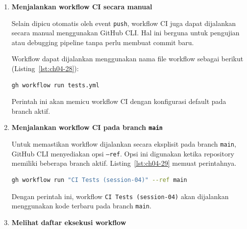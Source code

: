 \begin{enumerate}
Agar perubahan dapat diproses oleh GitHub Actions, commit lokal perlu
dikirim ke repository GitHub, khususnya ke branch \texttt{main} yang
digunakan sebagai branch utama pada modul ini. Perintah lengkapnya ada pada Listing~\ref{lst:ch04-27}.

\begin{lstlisting}[language=bash, caption={Mengirim perubahan ke repositori (3)}, label={lst:ch04-27}]
git push origin main
\end{lstlisting}

Setelah perintah ini dijalankan, GitHub akan menerima perubahan dan
event \texttt{push} akan menjadi salah satu pemicu workflow CI.

\item \textbf{Menjalankan workflow CI secara manual}

Selain dipicu otomatis oleh event \texttt{push}, workflow CI juga dapat
dijalankan secara manual menggunakan GitHub CLI. Hal ini berguna untuk
pengujian atau debugging pipeline tanpa perlu membuat commit baru.

Workflow dapat dijalankan menggunakan nama file workflow sebagai berikut (Listing~\ref{lst:ch04-28}):

\begin{lstlisting}[language=bash, caption={Memantau workflow di GitHub (2)}, label={lst:ch04-28}]
gh workflow run tests.yml
\end{lstlisting}

Perintah ini akan memicu workflow CI dengan konfigurasi default pada
branch aktif.

\item \textbf{Menjalankan workflow CI pada branch \texttt{main}}

Untuk memastikan workflow dijalankan secara eksplisit pada branch
\texttt{main}, GitHub CLI menyediakan opsi \texttt{--ref}. Opsi ini
digunakan ketika repository memiliki beberapa branch aktif. Listing~\ref{lst:ch04-29} memuat perintahnya.

\begin{lstlisting}[language=bash, caption={Memantau workflow di GitHub (3)}, label={lst:ch04-29}]
gh workflow run "CI Tests (session-04)" --ref main
\end{lstlisting}

Dengan perintah ini, workflow \texttt{CI Tests (session-04)} akan dijalankan
menggunakan kode terbaru pada branch \texttt{main}.

\item \textbf{Melihat daftar eksekusi workflow}


\end{enumerate}
